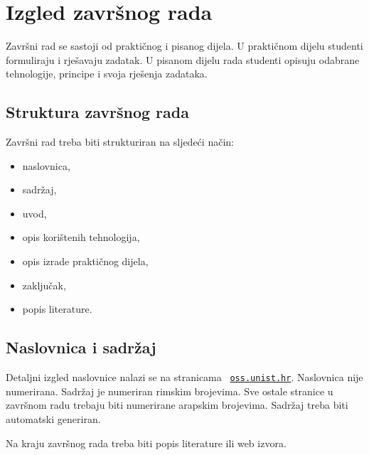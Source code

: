 \section{Izgled završnog rada}

Završni rad se sastoji od praktičnog i pisanog dijela. U praktičnom dijelu studenti formuliraju i rješavaju zadatak. U pisanom dijelu rada 
studenti opisuju odabrane tehnologije, principe i svoja rješenja zadataka.
\subsection{Struktura završnog rada}

Završni rad treba biti strukturiran na sljedeći način:
\begin{itemize}
 \item naslovnica,
 \item sadržaj,
 \item uvod,
 \item opis korištenih tehnologija,
 \item opis izrade praktičnog dijela,
 \item zaključak,
 \item popis literature.
\end{itemize}

\subsection{Naslovnica i sadržaj}
Detaljni izgled naslovnice nalazi se na stranicama ~\href{http://oss.unist.hr/index.php/odjel/propisi-i-dokumenti/243-pravilnik-o-izradi-i-obrani-zavrsnog-rada}{\texttt{oss.unist.hr}}.
Naslovnica nije numerirana.  
Sadržaj je numeriran rimskim brojevima. Sve ostale stranice u završnom radu trebaju biti numerirane arapskim brojevima. 
Sadržaj treba biti automatski generiran.

Na kraju završnog rada treba biti popis literature ili web izvora.
